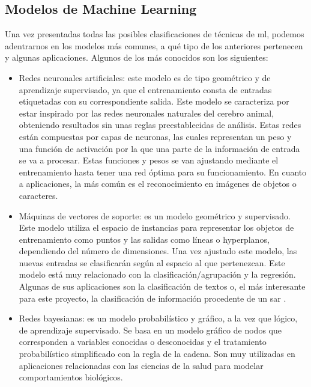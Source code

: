 \subsection{Modelos de Machine Learning}
\par Una vez presentadas todas las posibles clasificaciones de técnicas de \gls{ml}, podemos adentrarnos en los modelos más comunes, a qué tipo de los anteriores pertenecen y algunas aplicaciones. Algunos de los más conocidos son los siguientes:
\begin{itemize}
	\item Redes neuronales artificiales: este modelo es de tipo geométrico y de aprendizaje supervisado, ya que el entrenamiento consta de entradas etiquetadas con su correspondiente salida. Este modelo se caracteriza por estar inspirado por las redes neuronales naturales del cerebro animal, obteniendo resultados sin unas reglas preestablecidas de análisis. Estas redes están compuestas por capas de neuronas, las cuales representan un peso y una función de activación por la que una parte de la información de entrada se va a procesar. Estas funciones y pesos se van ajustando mediante el entrenamiento hasta tener una red óptima para su funcionamiento. En cuanto a aplicaciones, la más común es el reconocimiento en imágenes de objetos o caracteres.
	\item Máquinas de vectores de soporte: es un modelo geométrico y supervisado. Este modelo utiliza el espacio de instancias para representar los objetos de entrenamiento como puntos y las salidas como líneas o hyperplanos, dependiendo del número de dimensiones. Una vez ajustado este modelo, las nuevas entradas se clasificarán según al espacio al que pertenezcan. Este modelo está muy relacionado con la clasificación/agrupación y la regresión. Algunas de sus aplicaciones son la clasificación de textos \citep{MLText} o, el más interesante para este proyecto, la clasificación de información procedente de un \gls{sar} \citep{MLSAR}.
	\item Redes bayesianas: es un modelo probabilístico y gráfico, a la vez que lógico, de aprendizaje supervisado. Se basa en un modelo gráfico de nodos que corresponden a variables conocidas o desconocidas y el tratamiento probabilístico simplificado con la regla de la cadena. Son muy utilizadas en aplicaciones relacionadas con las ciencias de la salud para modelar comportamientos biológicos. 

\end{itemize}
